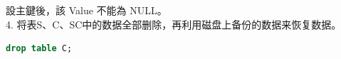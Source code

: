 \documentclass[12pt, a4paper]{report}
\begin{document}
\begin{figure}[H] %
    \centering %
\end{figure}

{設主鍵後，該 Value 不能為 NULL。}\\

4. 将表S、C、SC中的数据全部删除，再利用磁盘上备份的数据来恢复数据。\\

\begin{lstlisting}[language=SQL]
    drop table C;
\end{lstlisting}
\end{document}
